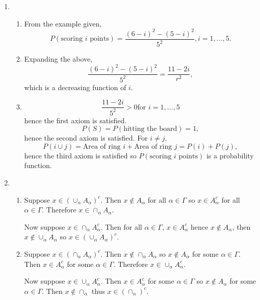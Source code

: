 \documentclass{article}
\begin{document}
\begin{enumerate}
    \item \begin{enumerate}
        \item From the example given, \[
            P(\text{scoring } i \text{ points}) = \frac{(6 - i)^2 - (5 - i)^2}{5^2}, i = 1, ..., 5.
            \]

        \item Expanding the above, 
        \[ \frac{(6 - i)^2 - (5 - i)^2}{5^2} = \frac{11 - 2i}{r^2}, \]
        which is a decreasing function of $i$.

        \item \[
        \frac{11 - 2i}{5^2} > 0 \text{for } i = 1, ..., 5
        \]
        hence the first axiom is satisfied.
        \[ P(S) = P(\text{hitting the board}) = 1, \]
        hence the second axiom is satisfied. For $i \neq j$,
        \[ P(i \cup j) = \text{Area of ring } i + \text{Area of ring } j 
        = P(i) + P(j), \]
        hence the third axiom is satisfied so $P(\text{scoring } i \text{ points})$ 
        is a probability function.
    \end{enumerate}
    
    \item \begin{enumerate}
        \item Suppose $x \in (\cup_{\alpha} A_{\alpha})^c$. Then $x \notin A_{\alpha}$ for all 
        $\alpha \in \Gamma$ so $x \in A_{\alpha}^{c}$ for all $\alpha \in \Gamma$. Therefore 
        $x \in \cap_{\alpha} A_{\alpha}$.

        Now suppose $x \in \cap_{\alpha} A_{\alpha}^{c}$. Then for all $\alpha \in \Gamma$, 
        $x \in A_{\alpha}^{c}$ hence $x \notin A_{\alpha}$, then 
        $x \notin \cup_{\alpha} A_{\alpha}$ so $x \in (\cup_{\alpha} A_{\alpha})^{c}$.

        \item Suppose $x \in (\cap_{\alpha} A_{\alpha})^{c}$. Then 
        $x \notin \cap_{\alpha} A_{\alpha}$ so $x \notin A_{\alpha}$ for some 
        $\alpha \in \Gamma$. Then $x \in A_{\alpha}^{c}$ for some $\alpha \in \Gamma$. 
        Therefore $x \in \cup_{\alpha} A_{\alpha}^{c}$.

        Now suppose $x \in \cup_{\alpha} A_{\alpha}^{c}$. Then $x \in A_{\alpha}^{c}$ for some 
        $\alpha \in \Gamma$ so $x \notin A_{\alpha}$ for some $\alpha \in \Gamma$. Then 
        $x \notin \cap_{\alpha}$ thus $x \in (\cap_{\alpha})^{c}$.
    \end{enumerate}


\end{enumerate}
\end{document}
